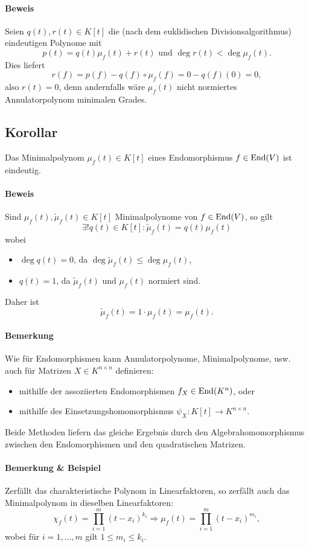 \paragraph{Beweis}
	Seien $ q(t),r(t)\in K[t] $ die (nach dem euklidischen Divisionsalgorithmus) eindeutigen Polynome mit
		\[ p(t) = q(t)\mu_f(t)+r(t) \text{ und }\deg r(t)<\deg \mu_f(t). \]
	Dies liefert
		\[ r(f) = p(f)-q(f)\circ \mu_f(f) = 0-q(f)(0) = 0, \]
	also $ r(t) = 0 $, denn andernfalls wäre $ \mu_f(t) $ nicht normiertes Annulatorpolynom minimalen Grades.
	
\subsection{Korollar}
	Das Minimalpolynom $ \mu_f(t)\in K[t] $ eines Endomorphismus $ f\in \operatorname{End}(V) $ ist eindeutig.
\paragraph{Beweis}
	Sind $ \mu_f(t),\tilde{\mu}_f(t)\in K[t] $ Minimalpolynome von $ f\in \operatorname{End}(V) $, so gilt
		\[ \exists! q(t)\in K[t] : \tilde{\mu}_f(t) = q(t)\mu_f(t) \] %
	wobei
		\begin{itemize}
			\item $ \deg q(t) = 0 $, da $ \deg \tilde{\mu}_f(t) \leq \deg \mu_f(t) $,
			\item $ q(t) = 1$, da $ \tilde{\mu}_f(t) $ und $ \mu_f(t) $ normiert sind.
		\end{itemize}
	Daher ist
		\[ \tilde{\mu}_f(t) = 1\cdot \mu_f(t) = \mu_f(t). \]
\paragraph{Bemerkung}
	Wie für Endomorphismen kann Annulatorpolynome, Minimalpolynome, usw. auch für Matrizen $ X\in K^{n\times n} $ definieren:
		\begin{itemize}
			\item mithilfe der assoziierten Endomorphismen $ f_X\in \operatorname{End}(K^n) $, oder 
			\item mithilfe des Einsetzungshomomorphismus $ \psi_X: K[t] \to K^{n\times n}. $ %
		\end{itemize}
	Beide Methoden liefern das gleiche Ergebnis durch den Algebrahomomorphismus zwischen den Endomorphismen und den quadratischen Matrizen.

\paragraph{Bemerkung \& Beispiel}
	Zerfällt das charakteristische Polynom in Linearfaktoren, so zerfällt auch das Minimalpolynom in dieselben Linearfaktoren:
		\[ \chi_f(t)= \prod_{i=1}^{m}(t-x_i)^{k_i} \Rightarrow \mu_f(t) = \prod_{i=1}^{m}(t-x_i)^{m_i}, \]
	wobei für $ i= 1,\dots,m $ gilt $ 1\leq m_i\leq k_i $.
	
